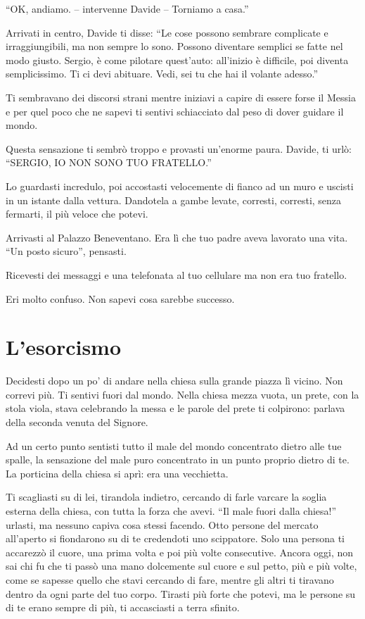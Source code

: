 “OK, andiamo. -- intervenne Davide -- Torniamo a casa.”

Arrivati in centro, Davide ti disse: “Le cose possono sembrare complicate e irraggiungibili, ma non sempre lo sono. Possono diventare semplici se fatte nel modo giusto. Sergio, è come pilotare quest'auto: all'inizio è difficile, poi diventa semplicissimo. Ti ci devi abituare. Vedi, sei tu che hai il volante adesso.”

Ti sembravano dei discorsi strani mentre iniziavi a capire di essere forse il Messia e per quel poco che ne sapevi ti sentivi schiacciato dal peso di dover guidare il mondo.

Questa sensazione ti sembrò troppo e provasti un'enorme paura. Davide, ti urlò: “SERGIO, IO NON SONO TUO FRATELLO.”

Lo guardasti incredulo, poi accostasti velocemente di fianco ad un muro e uscisti in un istante dalla vettura. Dandotela a gambe levate, corresti, corresti, senza fermarti, il più veloce che potevi.

Arrivasti al Palazzo Beneventano. Era lì che tuo padre aveva lavorato una vita. “Un posto sicuro”, pensasti.

Ricevesti dei messaggi e una telefonata al tuo cellulare ma non era tuo fratello.

Eri molto confuso. Non sapevi cosa sarebbe successo.

\section{L'esorcismo}
\label{esorcismo}

Decidesti dopo un po' di andare nella chiesa sulla grande piazza lì vicino. Non correvi più. Ti sentivi fuori dal mondo. Nella chiesa mezza vuota, un prete, con la stola viola, stava celebrando la messa e le parole del prete ti colpirono: parlava della seconda venuta del Signore.

Ad un certo punto sentisti tutto il male del mondo concentrato dietro alle tue spalle, la sensazione del male puro concentrato in un punto proprio dietro di te. La porticina della chiesa si aprì: era una vecchietta.

Ti scagliasti su di lei, tirandola indietro, cercando di farle varcare la soglia esterna della chiesa, con tutta la forza che avevi. “Il male fuori dalla chiesa!” urlasti, ma nessuno capiva cosa stessi facendo. Otto persone del mercato all'aperto si fiondarono su di te credendoti uno scippatore. Solo una persona ti accarezzò il cuore, una prima volta e poi più volte consecutive. Ancora oggi, non sai chi fu che ti passò una mano dolcemente sul cuore e sul petto, più e più volte, come se sapesse quello che stavi cercando di fare, mentre gli altri ti tiravano dentro da ogni parte del tuo corpo. Tirasti più forte che potevi, ma le persone su di te erano sempre di più, ti accasciasti a terra sfinito.

